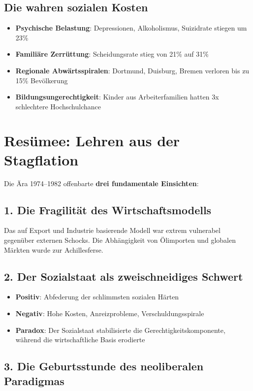 \subsection{Die wahren sozialen Kosten}

\begin{itemize}
    \item \textbf{Psychische Belastung}: Depressionen, Alkoholismus, Suizidrate stiegen um 23\%
    \item \textbf{Familiäre Zerrüttung}: Scheidungsrate stieg von 21\% auf 31\%
    \item \textbf{Regionale Abwärtsspiralen}: Dortmund, Duisburg, Bremen verloren bis zu 15\% Bevölkerung
    \item \textbf{Bildungsungerechtigkeit}: Kinder aus Arbeiterfamilien hatten 3x schlechtere Hochschulchance
\end{itemize}

\section{Resümee: Lehren aus der Stagflation}

Die Ära 1974–1982 offenbarte \textbf{drei fundamentale Einsichten}:

\subsection{1. Die Fragilität des Wirtschaftsmodells}

Das auf Export und Industrie basierende Modell war extrem vulnerabel gegenüber externen Schocks. Die Abhängigkeit von Ölimporten und globalen Märkten wurde zur Achillesferse.

\subsection{2. Der Sozialstaat als zweischneidiges Schwert}

\begin{itemize}
    \item \textbf{Positiv}: Abfederung der schlimmsten sozialen Härten
    \item \textbf{Negativ}: Hohe Kosten, Anreizprobleme, Verschuldungsspirale
    \item \textbf{Paradox}: Der Sozialstaat stabilisierte die Gerechtigkeitskomponente, während die wirtschaftliche Basis erodierte
\end{itemize}

\subsection{3. Die Geburtsstunde des neoliberalen Paradigmas}

